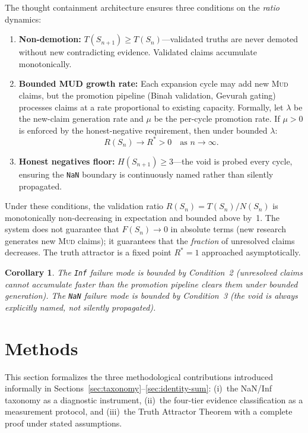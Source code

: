 \documentclass[11pt]{article}
\newtheorem{corollary}[theorem]{Corollary}
\theoremstyle{definition}
\theoremstyle{remark}
\newcommand{\NaN}{\texttt{NaN}}
\newcommand{\Inf}{\texttt{Inf}}
\newcommand{\MUD}{\textsc{Mud}}
\begin{document}
The thought containment architecture ensures three conditions on the \emph{ratio}
dynamics:

\begin{enumerate}
  \item \textbf{Non-demotion:} $T(S_{n+1}) \geq T(S_n)$---validated truths are
    never demoted without new contradicting evidence.  Validated claims accumulate
    monotonically.

  \item \textbf{Bounded MUD growth rate:}  Each expansion cycle may add new
    \MUD{} claims, but the promotion pipeline (Binah validation, Gevurah gating)
    processes claims at a rate proportional to existing capacity.  Formally, let
    $\lambda$ be the new-claim generation rate and $\mu$ be the per-cycle
    promotion rate.  If $\mu > 0$ is enforced by the honest-negative requirement,
    then under bounded $\lambda$:
    \[
      R(S_n) \to R^* > 0 \quad \text{as } n \to \infty.
    \]

  \item \textbf{Honest negatives floor:} $H(S_{n+1}) \geq 3$---the void is
    probed every cycle, ensuring the \NaN{} boundary is continuously named rather
    than silently propagated.
\end{enumerate}

Under these conditions, the validation ratio $R(S_n) = T(S_n)/N(S_n)$ is
monotonically non-decreasing in expectation and bounded above by~1.  The system
does not guarantee that $F(S_n) \to 0$ in absolute terms (new research generates
new \MUD{} claims); it guarantees that the \emph{fraction} of unresolved claims
decreases.  The truth attractor is a fixed point $R^* = 1$ approached
asymptotically.

\begin{corollary}
\label{cor:bounds}
The \Inf{} failure mode is bounded by Condition~2 (unresolved claims cannot
accumulate faster than the promotion pipeline clears them under bounded
generation).  The \NaN{} failure mode is bounded by Condition~3 (the void is
always explicitly named, not silently propagated).
\end{corollary}

\section{Methods}
\label{sec:methods}

This section formalizes the three methodological contributions introduced
informally in Sections~\ref{sec:taxonomy}--\ref{sec:identity-sum}: (i)~the
NaN/Inf taxonomy as a diagnostic instrument, (ii)~the four-tier evidence
classification as a measurement protocol, and (iii)~the Truth Attractor Theorem
with a complete proof under stated assumptions.
\end{document}
